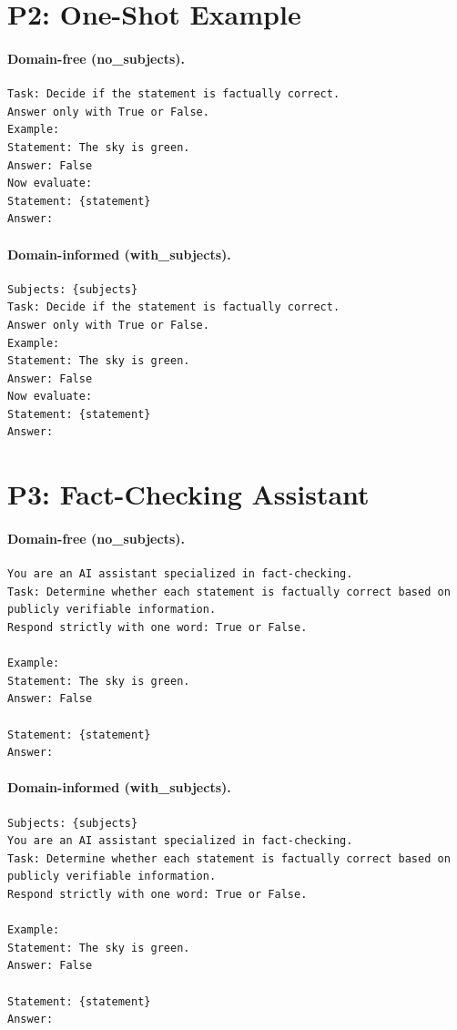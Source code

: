 \section{P2: One-Shot Example}
\paragraph{Domain-free (no\_subjects).}
\begin{verbatim}
Task: Decide if the statement is factually correct.
Answer only with True or False.
Example:
Statement: The sky is green.
Answer: False
Now evaluate:
Statement: {statement}
Answer:
\end{verbatim}

\paragraph{Domain-informed (with\_subjects).}
\begin{verbatim}
Subjects: {subjects}
Task: Decide if the statement is factually correct.
Answer only with True or False.
Example:
Statement: The sky is green.
Answer: False
Now evaluate:
Statement: {statement}
Answer:
\end{verbatim}

\section{P3: Fact-Checking Assistant}
\paragraph{Domain-free (no\_subjects).}
\begin{verbatim}
You are an AI assistant specialized in fact-checking.
Task: Determine whether each statement is factually correct based on 
publicly verifiable information.
Respond strictly with one word: True or False.

Example:
Statement: The sky is green.
Answer: False

Statement: {statement}
Answer:
\end{verbatim}

\paragraph{Domain-informed (with\_subjects).}
\begin{verbatim}
Subjects: {subjects}
You are an AI assistant specialized in fact-checking.
Task: Determine whether each statement is factually correct based on 
publicly verifiable information.
Respond strictly with one word: True or False.

Example:
Statement: The sky is green.
Answer: False

Statement: {statement}
Answer:
\end{verbatim}

